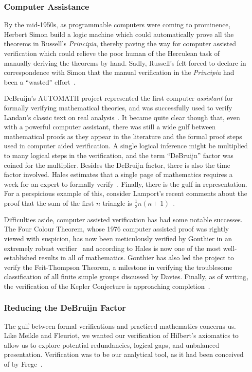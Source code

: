 \subsubsection{Computer Assistance}
By the mid-1950s, as programmable computers were coming to prominence, Herbert Simon build a logic machine which could automatically prove all the theorems in Russell's \emph{Principia}, thereby paving the way for computer assisted verification which could relieve the poor human of the Herculean task of manually deriving the theorems by hand. Sadly, Russell's felt forced to declare in correspondence with Simon that the manual verification in the \emph{Principia} had been a ``wasted'' effort~\cite{SimonObituary}.

DeBruijn's AUTOMATH project represented the first computer \emph{assistant} for formally verifying mathematical theories, and was successfully used to verify Landau's classic text on real analysis~\cite{LandauGrundlagen,LandauAUTOMATH}. It became quite clear though that, even with a powerful computer assistant, there was still a wide gulf between mathematical proofs as they appear in the literature and the formal proof steps used in computer aided verification. A single logical inference might be multiplied to many logical steps in the verification, and the term ``DeBruijn'' factor was coined for the multiplier. Besides the DeBruijn factor, there is also the time factor involved. Hales estimates that a single page of mathematics requires a week for an expert to formally verify~\cite{HalesFormalisingCost}. Finally, there is the gulf in representation. For a perspicious example of this, consider Lamport's recent comments about the proof that the sum of the first $n$ triangle is $\tfrac{1}{2}n(n+1)$~\cite{ProofMessageCertificate}.

Difficulties aside, computer assisted verification has had some notable successes. The Four Colour Theorem, whose 1976 computer assisted proof was rightly viewed with suspicion, has now been meticulously verified by Gonthier in an extremely robust verifier~\cite{GonthierFCT} and according to Hales is now one of the most well-established results in all of mathematics. Gonthier has also led the project to verify the Feit-Thompson Theorem, a milestone in verifying the troublesome classification of all finite simple groups discussed by Davies. Finally, as of writing, the verification of the Kepler Conjecture is approaching completion~\cite{flyspeck}.

\subsubsection{Reducing the DeBruijn Factor}
The gulf between formal verifications and practiced mathematics concerns us. Like Meikle and Fleuriot, we wanted our verification of Hilbert's axiomatics to allow us to explore potential redundancies, logical gaps, and unbalanced presentation. Verification was to be our analytical tool, as it had been conceived of by Frege~\cite{ProofsAboutProofs}. 

